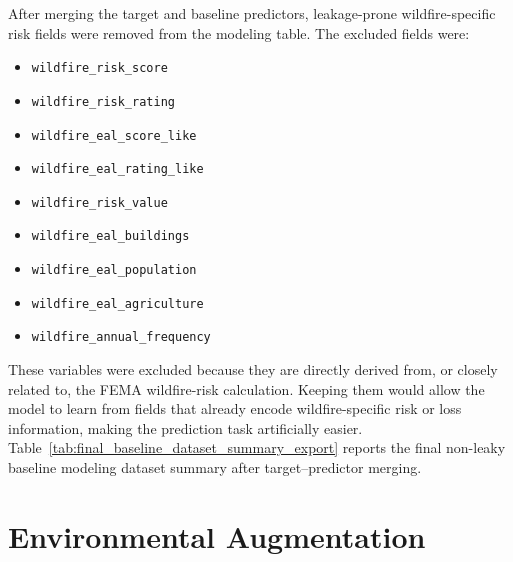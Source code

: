 \begin{table}[htbp]
    \centering
    \caption{Derived baseline features used to represent exposure intensity and value concentration.}
    \label{tab:derived_baseline_features_export}
\end{table}

After merging the target and baseline predictors, leakage-prone wildfire-specific risk fields were removed from the modeling table. The excluded fields were:

\begin{itemize}
    \setlength{\itemsep}{0pt}
    \item \texttt{wildfire\_risk\_score}
    \item \texttt{wildfire\_risk\_rating}
    \item \texttt{wildfire\_eal\_score\_like}
    \item \texttt{wildfire\_eal\_rating\_like}
    \item \texttt{wildfire\_risk\_value}
    \item \texttt{wildfire\_eal\_buildings}
    \item \texttt{wildfire\_eal\_population}
    \item \texttt{wildfire\_eal\_agriculture}
    \item \texttt{wildfire\_annual\_frequency}
\end{itemize}

These variables were excluded because they are directly derived from, or closely related to, the FEMA wildfire-risk calculation. Keeping them would allow the model to learn from fields that already encode wildfire-specific risk or loss information, making the prediction task artificially easier. Table~\ref{tab:final_baseline_dataset_summary_export} reports the final non-leaky baseline modeling dataset summary after target--predictor merging.

\begin{table}[htbp]
    \centering
    \caption{Summary of the final non-leaky baseline modeling dataset after target--predictor merging.}
    \label{tab:final_baseline_dataset_summary_export}
\end{table}

\section{Environmental Augmentation}


